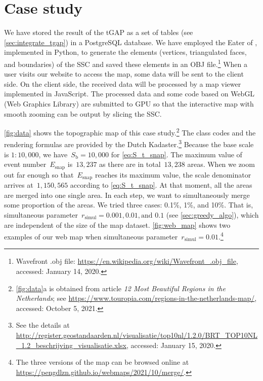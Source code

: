\documentclass[twocolumn]{svjour3}          %
\begin{document}
\section{Case study}
\label{sec:case_study}




We have stored the result of the tGAP 
as a set of tables (see \sect\ref{sec:integrate_tgap}) 
in a PostgreSQL database.
We have employed the Eater of \citet{Suba2014Merge},
implemented in Python, 
to generate the elements
(vertices, triangulated faces, and boundaries)
of the SSC \citep{vanOosterom2014tGAPSSC} 
and saved these elements in an OBJ file.\footnote{%
Wavefront .obj file:
\url{https://en.wikipedia.org/wiki/Wavefront_.obj_file},
accessed: January 14, 2020.}
When a user visits our website to access the map,
some data will be sent to the client side.  
On the client side,
the received data will be processed
by a map viewer implemented in JavaScript.
The processed data and some code based on WebGL (Web Graphics Library)
are submitted to GPU so that 
the interactive map with smooth zooming
can be output by slicing the SSC.


%
\fig\ref{fig:data} shows the topographic map of this case study.\footnote{%
    \fig\ref{fig:data}a is obtained from article 
    \emph{12 Most Beautiful Regions in the Netherlands}; see
    \url{https://www.touropia.com/regions-in-the-netherlands-map/},
    accessed: October 5, 2021.}
The class codes and the rendering formulas are provided by the Dutch Kadaster.\footnote{%
See the details at
\url{http://register.geostandaarden.nl/visualisatie/top10nl/1.2.0/BRT_TOP10NL_1.2_beschrijving_visualisatie.xlsx},
accessed: January 15, 2020.}
%
Because the base scale is $1:10{,}000$, 
we have~$S_\mathrm{b} = 10{,}000$ for \eq\ref{eq:S_t_snap}.
The maximum value of event number~$E_\mathrm{snap}$ is~$13{,}237$
as there are in total~$13{,}238$ areas.
When we zoom out far enough 
so that~$E_\mathrm{snap}$ reaches its maximum value,
the scale denominator arrives at~$1{,}150{,}565$
according to \eq\ref{eq:S_t_snap}.
At that moment, all the areas are merged into one single area.
In each step, we want to simultaneously merge some proportion of the areas.
We tried three cases: 0.1\%, 1\%, and 10\%.
That is, simultaneous parameter~$r_\mathrm{simul}=0.001, 0.01, \text{and~} 0.1$ 
(see \sect\ref{sec:greedy_algo}), 
which are independent of the size of the map dataset.
\fig\ref{fig:web_map} shows two examples of our web map when 
simultaneous parameter~$r_\mathrm{simul}=0.01$.\footnote{%
The three versions of the map can be browsed online at
\url{https://pengdlzn.github.io/webmaps/2021/10/merge/}.}
\end{document}
